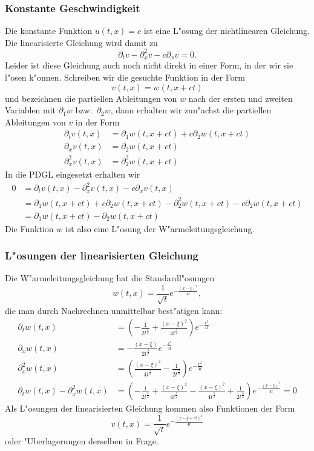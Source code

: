 \subsubsection{Konstante Geschwindigkeit}
Die konstante Funktion $u(t,x)=c$ ist eine L"osung der nichtlinearen
Gleichung. Die linearisierte Gleichung wird damit zu
\[
\partial_tv
-\partial_x^2v
-c\partial_xv=0.
\]
Leider ist diese Gleichung auch noch nicht direkt in einer Form,
in der wir sie l"osen k"onnen. Schreiben wir die gesuchte Funktion
in der Form
\[
v(t,x)=w(t,x+ct)
\]
und bezeichnen die partiellen Ableitungen von $w$ nach der ersten
und zweiten Variablen mit $\partial_1w$ bzw.~$\partial_2w$, dann
erhalten wir zun"achst die partiellen Ableitungen von $v$
in der Form
\begin{align*}
\partial_t v(t,x)&=\partial_1w(t,x+ct)+c\partial_2w(t,x+ct)
\\
\partial_x v(t,x)&=\partial_2w(t,x+ct)
\\
\partial_x^2v(t,x)&=\partial_2^2w(t,x+ct)
\end{align*}
In die PDGL eingesetzt erhalten wir
\begin{align*}
0&=
\partial_t v(t,x)
-\partial_x^2v(t,x)
-c\partial_x v(t,x)
\\
&=
\partial_1w(t,x+ct)+c\partial_2w(t,x+ct)
-\partial_2^2w(t,x+ct)
-c\partial_2w(t,x+ct)
\\
&=\partial_1w(t,x+ct)-\partial_2w(t,x+ct)
\end{align*}
Die Funktion $w$ ist also eine L"osung der W"armeleitungsgleichung.

\subsubsection{L"osungen der linearisierten Gleichung}
Die W"armeleitungsgleichung hat die Standardl"osungen
\[
w(t,x)=\frac1{\sqrt{t}}e^{-\frac{(x-\xi)^2}{4t}},
\]
die man durch Nachrechnen unmittelbar best"atigen kann:
\begin{align*}
\partial_t w(t,x)
&=
\left(
-\frac1{2t^{\frac32}}
+\frac{(x-\xi)^2}{4t^{\frac52}}
\right)e^{-\frac{x^2}{4t}}
\\
\partial_x w(t,x)
&=
-\frac{(x-\xi)}{2t^{\frac32}}
e^{-\frac{x^2}{4t}}
\\
\partial_x^2w(t,x)
&=
\left(
\frac{(x-\xi)^2}{4t^{\frac52}}
-\frac{1}{2t^{\frac32}}
\right)e^{-\frac{x^2}{4t}}
\\
\partial_tw(t,x)-\partial_x^2w(t,x)
&=
\left(
-\frac1{2t^{\frac32}}
+\frac{(x-\xi)^2}{4t^{\frac52}}
-\frac{(x-\xi)^2}{4t^{\frac52}}
+\frac{1}{2t^{\frac32}}
\right)e^{-\frac{(x-\xi)^2}{4t}}=0
\end{align*}
Als L"osungen der linearisierten Gleichung kommen also Funktionen der
Form
\[
v(t,x)=\frac1{\sqrt{t}}e^{-\frac{(x-\xi+ct)^2}{4t}}
\]
oder "Uberlagerungen derselben in Frage.


